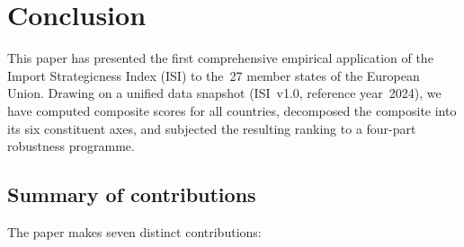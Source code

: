 \section{Conclusion}\label{sec:conclusion}

This paper has presented the first comprehensive empirical application
of the Import Strategicness Index (ISI) to the~27 member states of
the European Union.  Drawing on a unified data snapshot (ISI~v1.0,
reference year~2024), we have computed composite scores for all
countries, decomposed the composite into its six constituent axes,
and subjected the resulting ranking to a four-part robustness
programme.

\subsection{Summary of contributions}

The paper makes seven distinct contributions:


